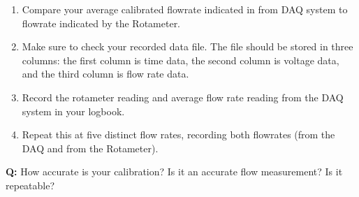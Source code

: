 \documentclass{article} %
\begin{document}
\begin{enumerate}
\begin{enumerate}[label=\alph*.]
            \item Compute the Average Voltage:
            \begin{itemize}
                \item Write a MATLAB script to calculate the mean voltage and SCFM from each data file.
                \item Record the result with at least two decimal places.
            \end{itemize}
        \end{enumerate}
    \item Compare your average calibrated flowrate indicated in from DAQ system to flowrate indicated by the Rotameter.
    \item Make sure to check your recorded data file. The file should be stored in three columns: the first column is time data, the second column is voltage data, and the third column is flow rate data.
    \item Record the rotameter reading and average flow rate reading from the DAQ system in your logbook.
    \item Repeat this at five distinct flow rates, recording both flowrates (from the DAQ and from the Rotameter).
\end{enumerate}

\textbf{Q:} How accurate is your calibration? Is it an accurate flow measurement? Is it repeatable? \\
\end{document}
